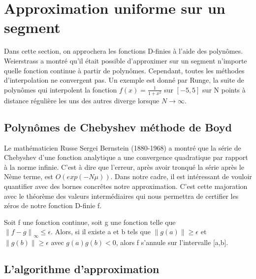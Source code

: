 \documentclass[a4paper,10.5pt]{article}
\begin{document}
	
	
 	
 	
	
	
	
	
	\section{Approximation uniforme sur un segment}
	
	Dans cette section, on approchera les fonctions D-finies à l'aide des polynômes.
	Weierstrass a montré qu'il était possible d'approximer sur un segment n'importe quelle fonction continue à partir de polynômes. Cependant, toutes les méthodes d'interpolation ne convergent pas. Un exemple est donné par Runge, la suite de polynômes qui interpolent la fonction $f(x)=\frac{1}{1+x^{2}}$ sur $[-5,5]$ sur N points à distance régulière les uns des autres diverge lorsque $N \rightarrow \infty$.
	
	\subsection{Polynômes de Chebyshev méthode de Boyd}
	
	
	Le mathématicien Russe Sergei Bernstein (1880-1968) a montré que la série de Chebyshev d'une fonction analytique a une convergence quadratique par rapport à la norme infinie. C'est à dire que l'erreur, après avoir tronqué la série après le Nème terme, est $O(exp(-N\mu))$. Dans notre cadre, il est intéressant de vouloir quantifier avec des bornes concrêtes notre approximation.
	C'est cette majoration avec le théorème des valeurs intermédiaires qui nous permettra de certifier les zéros de notre fonction D-finie f.
	
	
	\begin{proposition}
		Soit f une fonction continue, soit g une fonction telle que \\
		$\left\|f-g \right\|_{\infty} \leq \epsilon$. Alors, si il existe a et b tels que $\left\|g(a)\right\| \geq \epsilon$ et $\left\|g(b)\right\| \geq \epsilon$ avec $g(a)g(b) < 0$, alors f s'annule sur l'intervalle [a,b].
		
	\end{proposition}
	
	\subsection{L'algorithme d'approximation}
	
\end{document}
